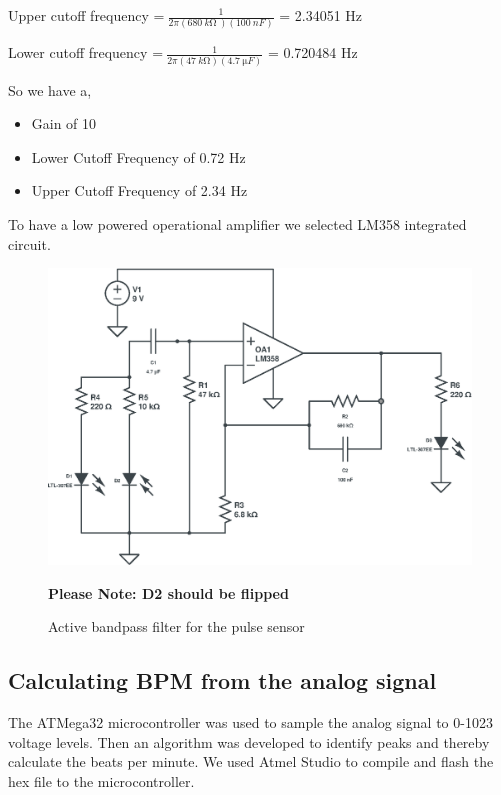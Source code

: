 \documentclass[12pt]{article}
\begin{document}
{\begin{center}
	
	
	Upper cutoff frequency =$\ \frac{1}{2\pi ( 680\ k\si{\ohm}\ )( 100\ nF)}$ = 2.34051 Hz
	
	
	
	Lower cutoff frequency =$\ \frac{1}{2 \pi  ( 47\ k\si{\ohm})( 4.7\ \si{\micro}F)}$ = 0.720484 Hz
	\end{center}
	
	
	
	
	
	So we have a,

		\begin{itemize}
			\item Gain of 10
			\item Lower Cutoff Frequency of 0.72 Hz
			\item Upper Cutoff Frequency of 2.34 Hz\\
		  \end{itemize}
		 To have a low powered operational amplifier we selected LM358 integrated circuit.
	
		\begin{figure}[!htbp]
			\includegraphics[width=\textwidth]{LM358-Bandpass}
			\caption{Active bandpass filter for the pulse sensor\\}
			\textbf{Please Note: D2 should be flipped}
		\end{figure}
		
	
		\clearpage
	\subsection{Calculating BPM from the analog signal}
	The ATMega32 microcontroller was used to sample the analog signal to 0-1023 voltage levels. Then an algorithm was developed to identify peaks and thereby calculate the beats per minute. We used Atmel Studio to compile and flash the hex file to the microcontroller. 


}
\end{document}
